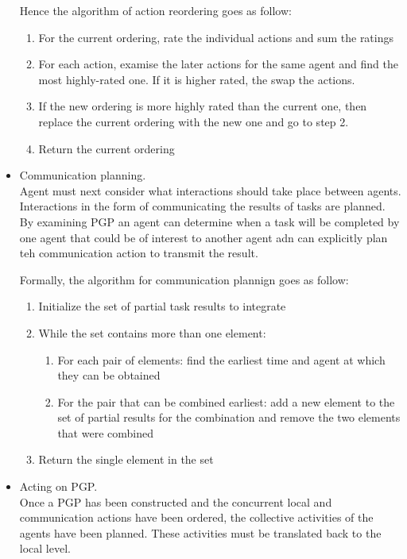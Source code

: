 \begin{itemize}
Hence the algorithm of action reordering goes as follow:
\begin{enumerate}
\item For the current ordering, rate the individual actions and sum the ratings
\item For each action, examise the later actions for the same agent and find the most highly-rated one. If it is higher rated, the swap the actions.
\item If the new ordering is more highly rated than the current one, then replace the current ordering with the new one and go to step 2.
\item Return the current ordering
\end{enumerate}
\item Communication planning.\\
Agent must next consider what interactions should take place between agents.\\
Interactions in the form of communicating the results of tasks are planned.\\
By examining PGP an agent can determine when a task will be completed by one agent that could be of interest to another agent adn can explicitly plan teh communication action to transmit the result.

Formally, the algorithm for communication plannign goes as follow:
\begin{enumerate}
\item Initialize the set of partial task results to integrate
\item While the set contains more than one element:
\begin{enumerate}
\item For each pair of elements: find the earliest time and agent at which they can be obtained
\item For the pair that can be combined earliest: add a new element to the set of partial results for the combination and remove the two elements that were combined
\end{enumerate}
\item Return the single element in the set
\end{enumerate}
\item Acting on PGP.\\
Once a PGP has been constructed and the concurrent local and communication actions have been ordered, the collective activities of the agents have been planned. These activities must be translated back to the local level.


\end{itemize}

